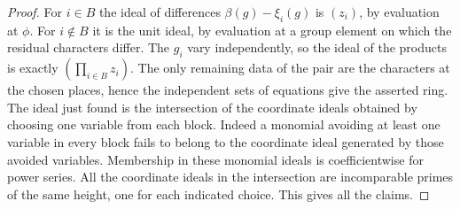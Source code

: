 \documentclass[a4paper,11pt]{article}
\theoremstyle{definition}
\theoremstyle{remark}
\numberwithin{equation}{section}
\begin{document}
\begin{proof}
For \(i\in B\) the ideal of differences
\(\beta(g)-\xi_i(g)\) is \((z_i)\), by evaluation at \(\phi\).
For \(i\notin B\) it is the unit ideal, by evaluation at a
group element on which the residual characters differ.
The \(g_i\) vary independently, so the ideal of the products
is exactly \((\prod_{i\in B}z_i)\). The only remaining data
of the pair are the characters at the chosen places, hence
the independent sets of equations give the asserted ring.
The ideal just found is the intersection of the coordinate
ideals obtained by choosing one variable from each block.
Indeed a monomial avoiding at least one variable in every
block fails to belong to the coordinate ideal generated by
those avoided variables. Membership in these monomial ideals
is coefficientwise for power series. All the coordinate ideals
in the intersection are incomparable primes of the same
height, one for each indicated choice. This gives all the
claims.
\end{proof}
\end{document}
